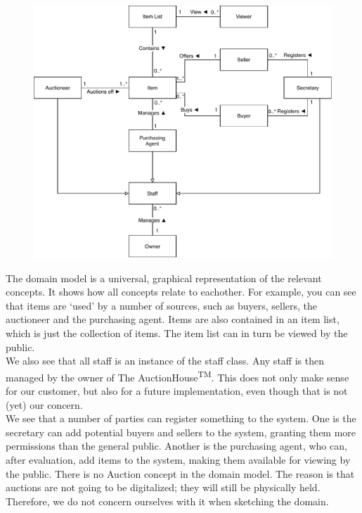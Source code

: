 \begin{figure}[H]
	\centering
	\includegraphics[scale=.9]{domainmodelUPD2.pdf}
\end{figure}
The domain model is a universal, graphical representation of the relevant concepts. It shows how all concepts relate to eachother. For example, you can see that items are `used' by a number of sources, such as buyers, sellers, the auctioneer and the purchasing agent. Items are also contained in an item list, which is just the collection of items. The item list can in turn be viewed by the public.\\
We also see that all staff is an instance of the staff class. Any staff is then managed by the owner of The AuctionHouse\textsuperscript{TM}. This does not only make sense for our customer, but also for a future implementation, even though that is not (yet) our concern.\\
We see that a number of parties can register something to the system. One is the secretary can add potential buyers and sellers to the system, granting them more permissions than the general public. Another is the purchasing agent, who can, after evaluation, add items to the system, making them available for viewing by the public.
There is no Auction concept in the domain model. The reason is that auctions are not going to be digitalized; they will still be physically held. Therefore, we do not concern ourselves with it when sketching the domain.